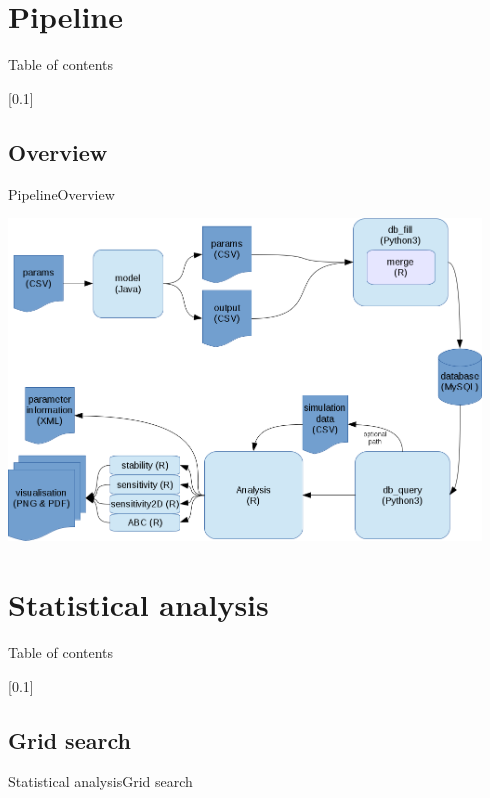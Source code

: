 \documentclass[10pt,aspectratio=43]{beamer}
\begin{document}
\section{Pipeline}
\begin{frame}{}{Table of contents}
\tableofcontents[currentsection, subsectionstyle=show/show/hide]
\end{frame}

[0.1]{}{}{}
\subsection{Overview}
\begin{frame}{Pipeline}{Overview}
\begin{center}
  \includegraphics[width=0.94\textwidth]{../data/workflow-2.png}
\end{center}
\end{frame}


\section{Statistical analysis}
\begin{frame}{}{Table of contents}
\tableofcontents[currentsection, subsectionstyle=show/show/hide]
\end{frame}

[0.1]{}{}{}
\subsection{Grid search}
\begin{frame}{Statistical analysis}{Grid search}
\end{frame}
\end{document}
